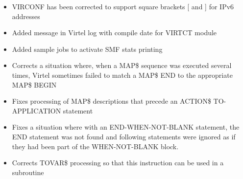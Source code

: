 \documentclass[letterpaper,10pt,english]{sphinxmanual}
\begin{document}
\begin{itemize}
\item {} 
VIRCONF has been corrected to support square brackets {[} and {]} for IPv6 addresses

\end{itemize}

\begin{itemize}
\item {} 
Added message in Virtel log with compile date for VIRTCT module

\end{itemize}

\begin{itemize}
\item {} 
Added sample jobs to activate SMF stats printing

\end{itemize}

\newpage

\begin{itemize}
\item {} 
Corrects a situation where, when a MAP\$ sequence was executed several times, Virtel sometimes failed to match a MAP\$ END to the appropriate MAP\$ BEGIN

\end{itemize}

\begin{itemize}
\item {} 
Fixes processing of MAP\$ descriptions that precede an ACTION\$ TO-APPLICATION statement

\end{itemize}

\begin{itemize}
\item {} 
Fixes a situation where with an END-WHEN-NOT-BLANK statement, the END statement was not found and following statements were ignored as if they had been part of the WHEN-NOT-BLANK block.

\end{itemize}

\begin{itemize}
\item {} 
Corrects TOVAR\$ processing so that this instruction can be used in a subroutine

\end{itemize}
\end{document}
